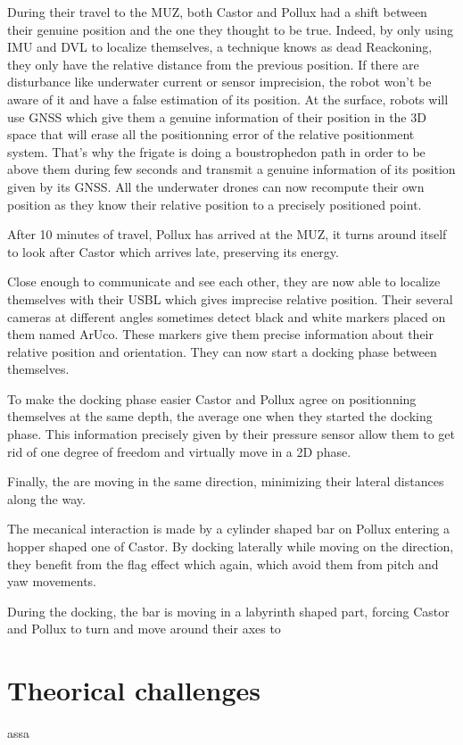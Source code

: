 \documentclass[twocolumn]{article}
\begin{document}
During their travel to the MUZ, both Castor and Pollux had a shift between their genuine position and the one they thought to be true. Indeed, by only using IMU and DVL to localize themselves, a technique knows as dead Reackoning, they only have the relative distance from the previous position. If there are disturbance like underwater current or sensor imprecision, the robot won't be aware of it and have a false estimation of its position. At the surface, robots will use GNSS which give them a genuine information of their position in the 3D space that will erase all the positionning error of the relative positionment system. That's why the frigate is doing a boustrophedon path in order to be above them during few seconds and transmit a genuine information of its position given by its GNSS. All the underwater drones can now recompute their own position as they know their relative position to a precisely positioned point.

After 10 minutes of travel, Pollux has arrived at the MUZ, it turns around itself to look after Castor which arrives late, preserving its energy.

Close enough to communicate and see each other, they are now able to localize themselves with their USBL which gives imprecise relative position. Their several cameras at different angles sometimes detect black and white markers placed on them named ArUco. These markers give them precise information about their relative position and orientation. They can now start a docking phase between themselves.

To make the docking phase easier Castor and Pollux agree on positionning themselves at the same depth, the average one when they started the docking phase. This information precisely given by their pressure sensor allow them to get rid of one degree of freedom and virtually move in a 2D phase.

Finally, the are moving in the same direction, minimizing their lateral distances along the way. 

The mecanical interaction is made by a cylinder shaped bar on Pollux entering a hopper shaped one of Castor. By docking laterally while moving on the direction, they benefit from the flag effect which again, which avoid them from pitch and yaw movements.

During the docking, the bar is moving in a labyrinth shaped part, forcing Castor and Pollux to turn and move around their axes to 


\section{Theorical challenges}
assa
\end{document}
